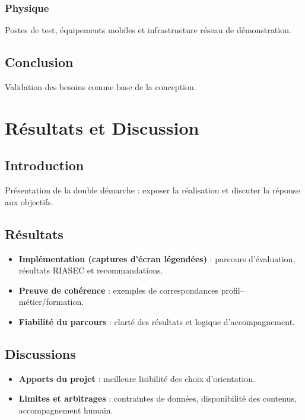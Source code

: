 \documentclass[12pt,a4paper]{report}
\begin{document}
\subsection*{Physique}
Postes de test, équipements mobiles et infrastructure réseau de démonstration.

\section{Conclusion}
Validation des besoins comme base de la conception.

\chapter{Résultats et Discussion}

\section{Introduction}
Présentation de la double démarche : exposer la réalisation et discuter la réponse aux objectifs.

\section{Résultats}
\begin{itemize}
    \item \textbf{Implémentation (captures d’écran légendées)} : parcours d’évaluation, résultats RIASEC et recommandations.
    \item \textbf{Preuve de cohérence} : exemples de correspondances profil--métier/formation.
    \item \textbf{Fiabilité du parcours} : clarté des résultats et logique d’accompagnement.
\end{itemize}

\section{Discussions}
\begin{itemize}
    \item \textbf{Apports du projet} : meilleure lisibilité des choix d’orientation.
    \item \textbf{Limites et arbitrages} : contraintes de données, disponibilité des contenus, accompagnement humain.
\end{itemize}
\end{document}

